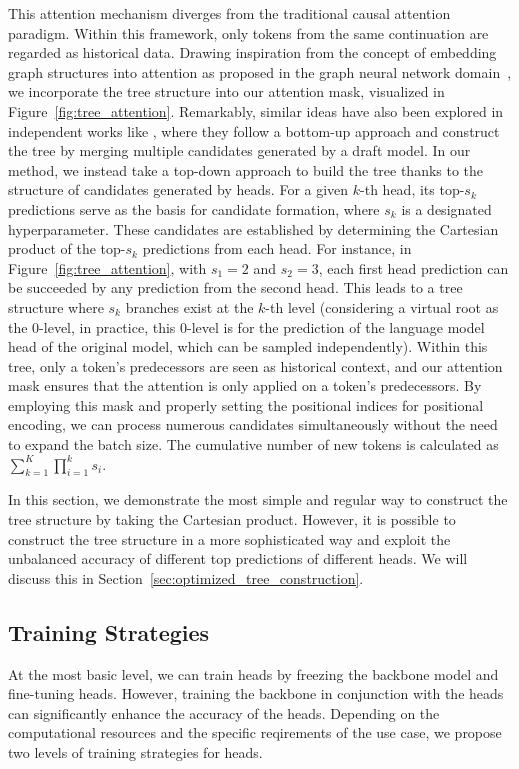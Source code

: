 This attention mechanism diverges from the traditional causal attention paradigm. Within this framework, only tokens from the same continuation are regarded as historical data. Drawing inspiration from the concept of embedding graph structures into attention as proposed in the graph neural network domain~\citep{ying2021transformers}, we incorporate the tree structure into our attention mask, visualized in Figure~\ref{fig:tree_attention}. Remarkably, similar ideas have also been explored in independent works like \citet{miao2023specinfer,spector2023accelerating}, where they follow a bottom-up approach and construct the tree by merging multiple candidates generated by a draft model. In our method, we instead take a top-down approach to build the tree thanks to the structure of candidates generated by \ours heads. For a given $k$-th head, its top-$s_k$ predictions serve as the basis for candidate formation, where $s_k$ is a designated hyperparameter. These candidates are established by determining the Cartesian product of the top-$s_k$ predictions from each head. For instance, in Figure~\ref{fig:tree_attention}, with $s_1=2$ and $s_2=3$, each first head prediction can be succeeded by any prediction from the second head. This leads to a tree structure where $s_k$ branches exist at the $k$-th level (considering a virtual root as the $0$-level, in practice, this $0$-level is for the prediction of the language model head of the original model, which can be sampled independently). Within this tree, only a token's predecessors are seen as historical context, and our attention mask ensures that the attention is only applied on a token's predecessors. By employing this mask and properly setting the positional indices for positional encoding, we can process numerous candidates simultaneously without the need to expand the batch size. The cumulative number of new tokens is calculated as $\sum_{k=1}^K \prod_{i=1}^k s_i$.

In this section, we demonstrate the most simple and regular way to construct the tree structure by taking the Cartesian product. However, it is possible to construct the tree structure in a more sophisticated way and exploit the unbalanced accuracy of different top predictions of different heads. We will discuss this in Section~\ref{sec:optimized_tree_construction}.
\subsection{Training Strategies}
\label{sec:training_recipe}
At the most basic level, we can train \ours heads by freezing the backbone model and fine-tuning \ours heads. However, training the backbone in conjunction with the \ours heads can significantly enhance the accuracy of the \ours heads. Depending on the computational resources and the specific reqirements of the use case, we propose two levels of training strategies for \ours heads.

